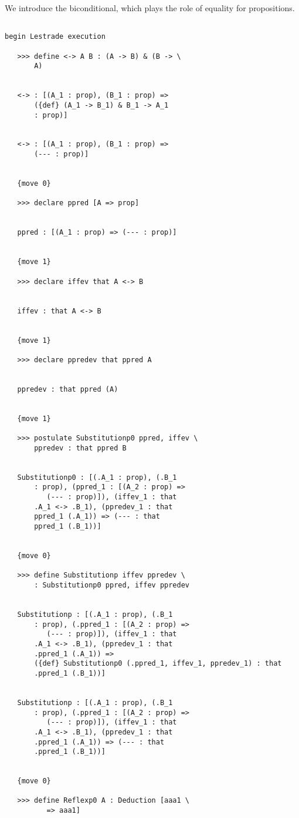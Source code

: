 \documentclass[12pt]{article}
\begin{document}
We introduce the biconditional, which plays the role of equality for propositions.

\begin{verbatim}

begin Lestrade execution

   >>> define <-> A B : (A -> B) & (B -> \
       A)


   <-> : [(A_1 : prop), (B_1 : prop) => 
       ({def} (A_1 -> B_1) & B_1 -> A_1 
       : prop)]


   <-> : [(A_1 : prop), (B_1 : prop) => 
       (--- : prop)]


   {move 0}

   >>> declare ppred [A => prop]


   ppred : [(A_1 : prop) => (--- : prop)]


   {move 1}

   >>> declare iffev that A <-> B


   iffev : that A <-> B


   {move 1}

   >>> declare ppredev that ppred A


   ppredev : that ppred (A)


   {move 1}

   >>> postulate Substitutionp0 ppred, iffev \
       ppredev : that ppred B


   Substitutionp0 : [(.A_1 : prop), (.B_1 
       : prop), (ppred_1 : [(A_2 : prop) => 
          (--- : prop)]), (iffev_1 : that 
       .A_1 <-> .B_1), (ppredev_1 : that 
       ppred_1 (.A_1)) => (--- : that 
       ppred_1 (.B_1))]


   {move 0}

   >>> define Substitutionp iffev ppredev \
       : Substitutionp0 ppred, iffev ppredev


   Substitutionp : [(.A_1 : prop), (.B_1 
       : prop), (.ppred_1 : [(A_2 : prop) => 
          (--- : prop)]), (iffev_1 : that 
       .A_1 <-> .B_1), (ppredev_1 : that 
       .ppred_1 (.A_1)) => 
       ({def} Substitutionp0 (.ppred_1, iffev_1, ppredev_1) : that 
       .ppred_1 (.B_1))]


   Substitutionp : [(.A_1 : prop), (.B_1 
       : prop), (.ppred_1 : [(A_2 : prop) => 
          (--- : prop)]), (iffev_1 : that 
       .A_1 <-> .B_1), (ppredev_1 : that 
       .ppred_1 (.A_1)) => (--- : that 
       .ppred_1 (.B_1))]


   {move 0}

   >>> define Reflexp0 A : Deduction [aaa1 \
          => aaa1]



\end{verbatim}
\end{document}
